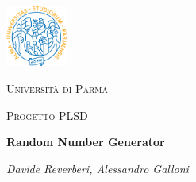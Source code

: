 \documentclass{article}
\begin{document}
\begin{titlepage}
  \centering
  \includegraphics[width=0.15\textwidth]{uniprLogo.png}\par\vspace{1cm}
  {\LARGE \textsc{Università di Parma}\par}
	\vspace{1cm}
	{\Large \textsc{Progetto PLSD}\par}
	\vspace{1.5cm}
	{\huge\bfseries Random Number Generator\par}
	\vspace{2cm}
	{\Large\itshape Davide Reverberi, Alessandro Galloni\par}

	\vfill
\end{titlepage}

\tableofcontents






\end{document}
